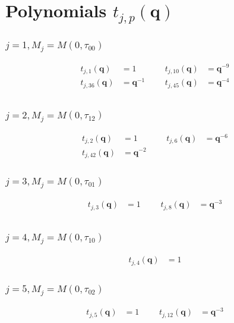 \section{Polynomials $t_{j,p}(\boldsymbol{q})$}

\subsubsection{$j=1, M_{j}=M(0,\tau_{00})$}
\begin{align*}
t_{j,1}(\boldsymbol{q})&=1 &&& t_{j,10}(\boldsymbol{q})&=\boldsymbol{q}^{-9} \\
t_{j,36}(\boldsymbol{q})&=\boldsymbol{q}^{-1} &&& t_{j,45}(\boldsymbol{q})&=\boldsymbol{q}^{-4} \\
\end{align*}

\subsubsection{$j=2, M_{j}=M(0,\tau_{12})$}
\begin{align*}
t_{j,2}(\boldsymbol{q})&=1 &&& t_{j,6}(\boldsymbol{q})&=\boldsymbol{q}^{-6} \\
t_{j,42}(\boldsymbol{q})&=\boldsymbol{q}^{-2}
\end{align*}

\subsubsection{$j=3, M_{j}=M(0,\tau_{01})$}
\begin{align*}
t_{j,3}(\boldsymbol{q})&=1 &&& t_{j,8}(\boldsymbol{q})&=\boldsymbol{q}^{-3} \\
\end{align*}

\subsubsection{$j=4, M_{j}=M(0,\tau_{10})$}
\begin{align*}
t_{j,4}(\boldsymbol{q})&=1
\end{align*}

\subsubsection{$j=5, M_{j}=M(0,\tau_{02})$}
\begin{align*}
t_{j,5}(\boldsymbol{q})&=1 &&& t_{j,12}(\boldsymbol{q})&=\boldsymbol{q}^{-3} \\
\end{align*}

